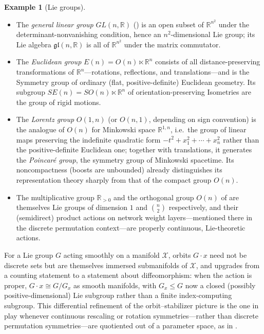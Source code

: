 \documentclass[11pt]{article}
\theoremstyle{plain}
\theoremstyle{definition}
\newtheorem{Example}{Example}[section]
\begin{document}
\begin{Example}[Lie groups]
\label{ex:lie-groups}
\begin{itemize}
    \item The \emph{general linear group} $GL(n,\mathbb{R})$
    () is an open subset of $\mathbb{R}^{n^2}$ under
    the determinant-nonvanishing condition, hence an $n^2$-dimensional Lie
    group; its Lie algebra $\mathfrak{gl}(n,\mathbb{R})$ is all of
    $\mathbb{R}^{n^2}$ under the matrix commutator.
    \item The \emph{Euclidean group} $E(n) = O(n) \ltimes \mathbb{R}^n$
    consists of all distance-preserving transformations of
    $\mathbb{R}^n$---rotations, reflections, and translations---and is the
    Symmetry group of ordinary (flat, positive-definite) Euclidean geometry.
    Its subgroup $SE(n) = SO(n) \ltimes \mathbb{R}^n$ of orientation-preserving
    Isometries are the group of rigid motions.
    \item The \emph{Lorentz group} $O(1,n)$ (or $O(n,1)$, depending on sign
    convention) is the analogue of $O(n)$ for Minkowski space
    $\mathbb{R}^{1,n}$, i.e.\ the group of linear maps preserving the
    indefinite quadratic form $-t^2 + x_1^2 + \cdots + x_n^2$ rather than the
    positive-definite Euclidean one; together with translations, it generates
    the \emph{Poincar\'e group}, the symmetry group of Minkowski spacetime.
    Its noncompactness (boosts are unbounded) already distinguishes its
    representation theory sharply from that of the compact group $O(n)$.
    \item The multiplicative group $\mathbb{R}_{>0}$ and the orthogonal group
    $O(n)$ of  are themselves Lie groups of dimension
    $1$ and $\binom{n}{2}$ respectively, and their (semidirect) product
    actions on network weight layers---mentioned there in the discrete
    permutation context---are properly continuous, Lie-theoretic actions.
\end{itemize}
\end{Example}

For a Lie group $G$ acting smoothly on a manifold $\mathcal{X}$, orbits
$G \cdot x$ need not be discrete sets but are themselves immersed
submanifolds of $\mathcal{X}$, and  upgrades from a
counting statement to a statement about diffeomorphism: when the action is
proper, $G \cdot x \cong G / G_x$ as smooth manifolds, with $G_x \leq G$ now
a closed (possibly positive-dimensional) Lie subgroup rather than a finite
index-computing subgroup. This differential refinement of the
orbit--stabilizer picture is the one in play whenever continuous rescaling
or rotation symmetries---rather than discrete permutation
symmetries---are quotiented out of a parameter space, as in
.
\end{document}
